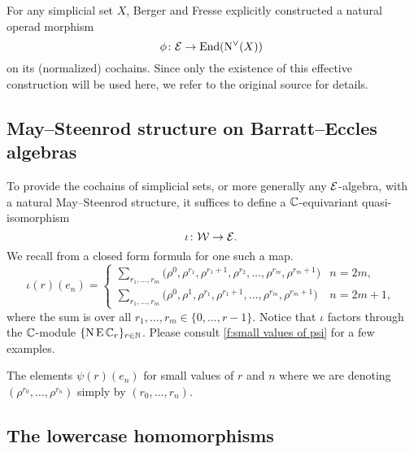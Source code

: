 For any simplicial set $X$, Berger and Fresse explicitly constructed a natural operad morphism
\[
\phi \colon \mathcal{E} \to \mathrm{End}(\operatorname{N^{\vee}}(X))
\]
on its (normalized) cochains.
Since only the existence of this effective construction will be used here, we refer to the original source for details.

\subsection{May--Steenrod structure on Barratt--Eccles algebras}

To provide the cochains of simplicial sets, or more generally any $\mathcal{E}$-algebra, with a natural May--Steenrod structure, it suffices to define a $\mathbb{C}$-equivariant quasi-isomorphism
\[
\iota \colon \mathcal{W} \to \mathcal{E}.
\]
We recall from \cite{medina2021may_st} a closed form formula for one such a map.
\begin{equation*}
	\iota(r)(e_{n}) = \begin{cases}
		\displaystyle{\sum_{r_1, \dots, r_m}} \big(\rho^0, \rho^{r_1}, \rho^{r_1+1}, \rho^{r_2}, \dots, \rho^{r_{m}}, \rho^{r_{m}+1} \big) & n = 2m, \\
		\displaystyle{\sum_{r_1, \dots, r_m}} \big(\rho^0, \rho^1, \rho^{r_1}, \rho^{r_1+1}, \dots, \rho^{r_{m}}, \rho^{r_{m}+1} \big) & n = 2m+1,
	\end{cases}
\end{equation*}
where the sum is over all $r_1, \dots, r_m \in \{0, \dots, r-1\}$.
Notice that $\iota$ factors through the $\mathbb{C}$-module $\{\operatorname{N}\operatorname{E}\mathbb{C}_r\}_{r\in\mathbb{N}}$.
Please consult \cref{f:small values of psi} for a few examples.

\begin{table}
	\centering
	
	\caption{The elements $\psi(r)(e_n)$ for small values of $r$ and $n$ where we are denoting $(\rho^{r_0}, \dots, \rho^{r_n})$ simply by $(r_0, \dots, r_n)$.}
	\label{f:small values of psi}
\end{table}

\subsection{The lowercase homomorphisms}

